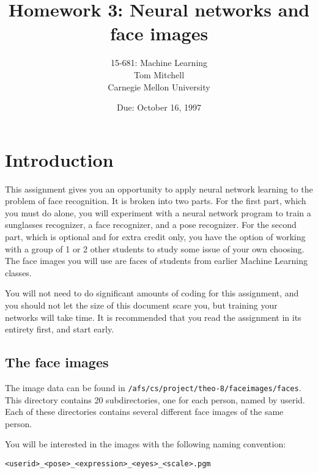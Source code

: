 \def\BOX#1{\fbox{\tt #1}}


\title{Homework 3: Neural networks and face images }
\author{15-681: Machine Learning \\
Tom Mitchell \\
Carnegie Mellon University}
\date{Due: October 16, 1997}
\maketitle

\section{Introduction}

This assignment gives you an opportunity to apply neural network learning to
the problem of face recognition.  It is broken into two parts.  For the first
part, which you must do alone, you will experiment with a neural network
program to train a sunglasses recognizer, a face recognizer, and a pose
recognizer.  For the second part, which is optional and for extra credit only,
you have the option of working with a group of 1 or 2 other students to study
some issue of your own choosing.  The face images you will use are faces of
students from earlier Machine Learning classes.

You will not need to do significant amounts of coding for this assignment,
and you should not let the size of this document scare you, but training
your networks will take time.  It is recommended that you read the
assignment in its entirety first, and start early.

\subsection{The face images}

The image data can be found in {\tt /afs/cs/project/theo-8/faceimages/faces}.
This directory contains 20 subdirectories, one for each person, named by
userid.  Each of these directories contains several different face images of
the same person.

You will be interested in the images with the following naming convention:

{\tt <userid>\_<pose>\_<expression>\_<eyes>\_<scale>.pgm}

